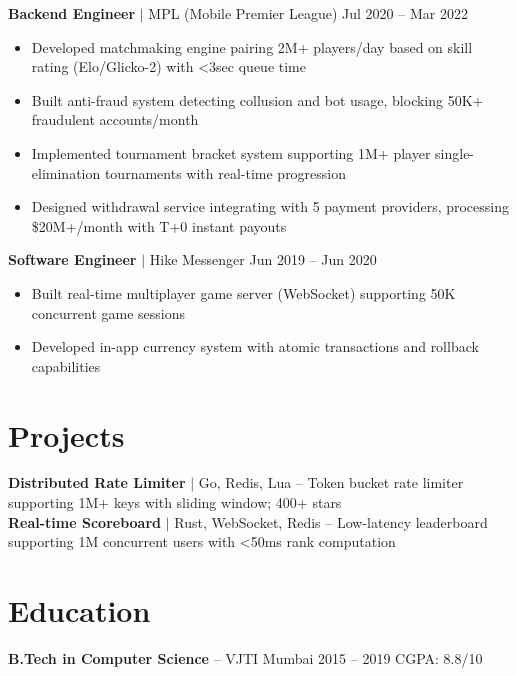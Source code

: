 \documentclass[10pt,a4paper]{article}
\begin{document}
\textbf{Backend Engineer} $\mid$ MPL (Mobile Premier League) \hfill {\small\color{accent} Jul 2020 -- Mar 2022}
\begin{itemize}
    \item Developed matchmaking engine pairing 2M+ players/day based on skill rating (Elo/Glicko-2) with <3sec queue time
    \item Built anti-fraud system detecting collusion and bot usage, blocking 50K+ fraudulent accounts/month
    \item Implemented tournament bracket system supporting 1M+ player single-elimination tournaments with real-time progression
    \item Designed withdrawal service integrating with 5 payment providers, processing \$20M+/month with T+0 instant payouts
\end{itemize}

\textbf{Software Engineer} $\mid$ Hike Messenger \hfill {\small\color{accent} Jun 2019 -- Jun 2020}
\begin{itemize}
    \item Built real-time multiplayer game server (WebSocket) supporting 50K concurrent game sessions
    \item Developed in-app currency system with atomic transactions and rollback capabilities
\end{itemize}

\section{Projects}

\textbf{Distributed Rate Limiter} {\small$\mid$ Go, Redis, Lua} -- Token bucket rate limiter supporting 1M+ keys with sliding window; 400+ stars\\[2pt]
\textbf{Real-time Scoreboard} {\small$\mid$ Rust, WebSocket, Redis} -- Low-latency leaderboard supporting 1M concurrent users with <50ms rank computation

\section{Education}

\textbf{B.Tech in Computer Science} -- VJTI Mumbai \hfill 2015 -- 2019 \quad CGPA: 8.8/10
\end{document}
